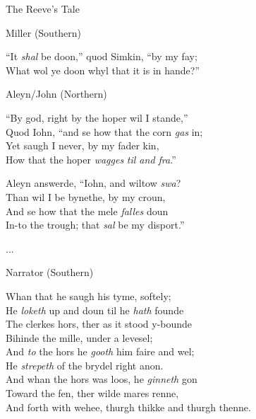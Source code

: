 \begin{texts}{The Reeve's Tale}
\begin{textglossed}
Miller (Southern)

``It \emph{shal} be doon,'' quod Simkin, ``by my fay;\\
What wol ye doon whyl that it is in hande?''

Aleyn/John (Northern)

``By god, right by the hoper wil I stande,''\\
Quod Iohn, ``and se how that the corn \emph{gas} in;\\
Yet saugh I never, by my fader kin,\\
How that the hoper \emph{wagges} \emph{til and fra}.''

Aleyn answerde, ``Iohn, and wiltow \emph{swa}?\\
Than wil I be bynethe, by my croun,\\ 
And se how that the mele \emph{falles} doun\\
In-to the trough; that \emph{sal} be my disport.'' 

...

Narrator (Southern)

Whan that he saugh his tyme, softely;\\
He \emph{loketh} up and doun til he \emph{hath} founde\\
The clerkes hors, ther as it stood y-bounde\\
Bihinde the mille, under a levesel;\\
And \emph{to} the hors he \emph{gooth} him faire and wel;\\
He \emph{strepeth} of the brydel right anon.\\
And whan the hors was loos, he \emph{ginneth} gon \\ 
Toward the fen, ther wilde mares renne,\\
And forth with wehee, thurgh thikke and thurgh thenne.
    

\end{textglossed}
\end{texts}
